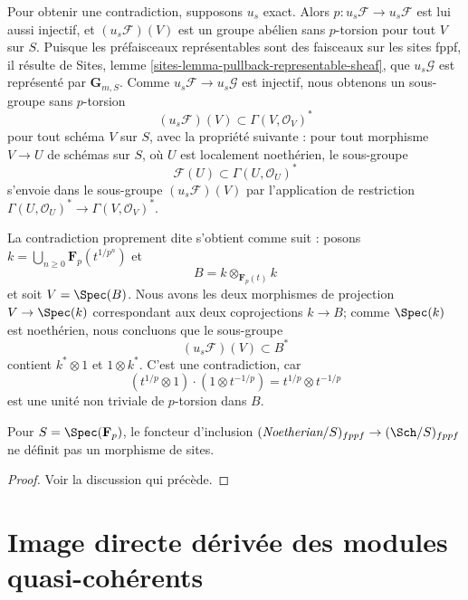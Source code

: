 \medskip\noindent
Pour obtenir une contradiction, supposons $u_s$ exact. Alors
$p : u_s\mathcal{F} \to u_s\mathcal{F}$ est lui aussi injectif,
et $(u_s\mathcal{F})(V)$ est un groupe abélien sans $p$-torsion
pour tout $V$ sur $S$. Puisque les
préfaisceaux représentables sont des faisceaux sur les sites fppf, il résulte de
Sites, lemme \ref{sites-lemma-pullback-representable-sheaf},
que $u_s\mathcal{G}$ est représenté par
$\mathbf{G}_{m, S}$. Comme $u_s\mathcal{F} \to u_s\mathcal{G}$
est injectif, nous obtenons un sous-groupe sans $p$-torsion
$$
(u_s\mathcal{F})(V) \subset \Gamma(V, \mathcal{O}_V)^*
$$
pour tout schéma $V$ sur $S$, avec la propriété suivante :
pour tout morphisme $V \to U$ de schémas sur $S$, où $U$ est
localement noethérien, le sous-groupe
$$
\mathcal{F}(U) \subset \Gamma(U, \mathcal{O}_U)^*
$$
s'envoie dans le sous-groupe $(u_s\mathcal{F})(V)$ par l'application de restriction
$\Gamma(U, \mathcal{O}_U)^* \to \Gamma(V, \mathcal{O}_V)^*$.

\medskip\noindent
La contradiction proprement dite s'obtient comme suit :
posons $k = \bigcup_{n \geq 0} \mathbf{F}_p(t^{1/{p^n}})$
et
$$
B = k \otimes_{\mathbf{F}_p(t)} k
$$
et soit $V = \Spec(B)$. Nous avons les deux morphismes de projection
$V \to \Spec(k)$ correspondant aux deux coprojections $k \to B$;
comme $\Spec(k)$ est noethérien, nous concluons que le sous-groupe
$$
(u_s\mathcal{F})(V) \subset B^*
$$
contient $k^* \otimes 1$ et $1 \otimes k^*$. C'est une contradiction,
car
$$
(t^{1/p} \otimes 1) \cdot (1 \otimes t^{-1/p}) =
t^{1/p} \otimes t^{-1/p}
$$
est une unité non triviale de $p$-torsion dans $B$.

\begin{lemma}
\label{lemma-not-a-morphism-of-sites-noetherian-to-all}
Pour $S = \Spec(\mathbf{F}_p)$, le foncteur d'inclusion
$(\textit{Noetherian}/S)_{fppf} \to (\Sch/S)_{fppf}$
ne définit pas un morphisme de sites.
\end{lemma}

\begin{proof}
Voir la discussion qui précède.
\end{proof}





\section{Image directe dérivée des modules quasi-cohérents}
\label{section-derived-push-quasi-coherent}


